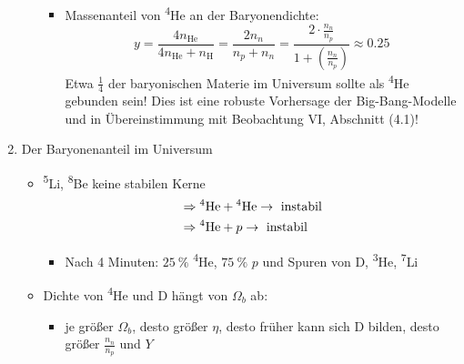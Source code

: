 \begin{enumerate}[label={$(\arabic*)$}]
\begin{itemize}
\begin{align*}
				\end{align*}
				\begin{itemize}
					\item Massenanteil von \textsuperscript{4}He an der Baryonendichte:
						\begin{equation*}
							y=\frac{4n_\text{He}}{4n_\text{He}+n_\text{H}}=\frac{2n_n}{n_p+n_n}=\frac{2\cdot\frac{n_n}{n_p}}{1+\left(\frac{n_n}{n_p}\right)}\approx\num{0.25}
						\end{equation*}
						Etwa $\frac{1}{4}$ der baryonischen Materie im Universum sollte als \textsuperscript{4}He gebunden sein! Dies ist eine robuste Vorhersage der Big-Bang-Modelle und in Übereinstimmung mit Beobachtung VI, Abschnitt (4.1)!
				\end{itemize}
		\end{itemize}
	\item Der Baryonenanteil im Universum
		\begin{figure}[H]
			\centering
		\end{figure}
		\begin{itemize}
			\item \textsuperscript{5}Li, \textsuperscript{8}Be keine stabilen Kerne
				\begin{align*}
					&\Rightarrow \text{\textsuperscript{4}He}+\text{\textsuperscript{4}He}\to\text{ instabil}\\
					&\Rightarrow \text{\textsuperscript{4}He}+p\to\text{ instabil}
				\end{align*}
				\begin{itemize}
					\item Nach 4 Minuten: $\SI{25}{\%}$ \textsuperscript{4}He, $\SI{75}{\%}$ $p$ und Spuren von D, \textsuperscript{3}He, \textsuperscript{7}Li
				\end{itemize}
			\item Dichte von \textsuperscript{4}He und D hängt von $\Omega_b$ ab:
				\begin{itemize}[label={\textbullet}]
					\item je größer $\Omega_b$, desto größer $\eta$, desto früher kann sich D bilden, desto größer $\frac{n_n}{n_p}$ und $Y$

\end{itemize}
\end{itemize}
\end{enumerate}
